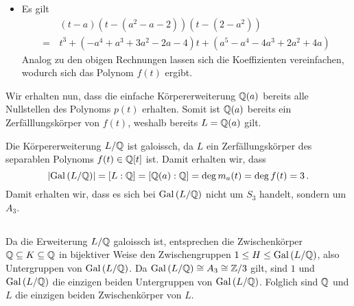 \begin{itemize}
  \item
    Es gilt
    \begin{align*}
       &\,  (t - a)(t - (a^2 - a - 2))(t - (2 - a^2)) \\
      =&\,  t^3 + (-a^4 + a^3 + 3a^2 - 2a - 4) t + (a^5 - a^4 - 4a^3 + 2a^2 + 4a)
    \end{align*}
    Analog zu den obigen Rechnungen lassen sich die Koeffizienten vereinfachen, wodurch sich das Polynom $f(t)$ ergibt.
\end{itemize}

Wir erhalten nun, dass die einfache Körpererweiterung $\mathbb{Q}(a)$ bereits alle Nullstellen des Polynoms $p(t)$ erhalten.
Somit ist $\mathbb{Q}(a)$ bereits ein Zerfälllungskörper von $f(t)$, weshalb bereits $L = \mathbb{Q}(a)$ gilt.

Die Körpererweiterung $L/\mathbb{Q}$ ist galoissch, da $L$ ein Zerfällungskörper des separablen Polynoms $f(t) \in \mathbb{Q}[t]$ ist.
Damit erhalten wir, dass
\[
    |{\operatorname{Gal}{(}L/\mathbb{Q})}|
  = [L : \mathbb{Q}]
  = [\mathbb{Q}(a) : \mathbb{Q}]
  = \deg m_a(t)
  = \deg f(t)
  = 3 \,.
\]
Damit erhalten wir, dass es sich bei $\operatorname{Gal}{(}L/\mathbb{Q})$ nicht um $S_3$ handelt, sondern um $A_3$.





\subsection{}

Da die Erweiterung $L/\mathbb{Q}$ galoissch ist, entsprechen die Zwischenkörper $\mathbb{Q} \subseteq K \subseteq \mathbb{Q}$ in bijektiver Weise den Zwischengruppen $1 \leq H \leq \operatorname{Gal}{(}L/\mathbb{Q})$, also Untergruppen von $\operatorname{Gal}{(}L/\mathbb{Q})$.
Da $\operatorname{Gal}{(}L/\mathbb{Q}) \cong A_3 \cong \mathbb{Z}/3$ gilt, sind $1$ und $\operatorname{Gal}{(}L/\mathbb{Q})$ die einzigen beiden Untergruppen von $\operatorname{Gal}{(}L/\mathbb{Q})$.
Folglich sind $\mathbb{Q}$ und $L$ die einzigen beiden Zwischenkörper von $L$.




